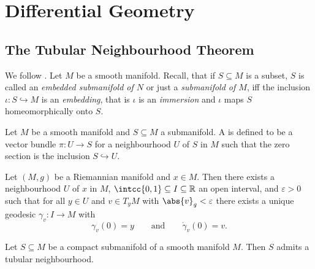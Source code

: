 \chapter{Differential Geometry}
\section*{The Tubular Neighbourhood Theorem}
We follow \cite[344--346]{spivak:DGI:2005}. Let $M$ be a smooth manifold. Recall, that if $S \subseteq M$ is a subset, $S$ is called an \emph{embedded submanifold of $N$} or just a \emph{submanifold of $M$}, iff the inclusion $\iota : S \hookrightarrow M$ is an \emph{embedding}, that is $\iota$ is an \emph{immersion} and $\iota$ maps $S$ homeomorphically onto $S$.

\begin{definition}
	Let $M$ be a smooth manifold and $S \subseteq M$ a submanifold. A  is defined to be a vector bundle $\pi : U \to S$ for a neighbourhood $U$ of $S$ in $M$ such that the zero section is the inclusion $S \hookrightarrow U$.
\end{definition}

\begin{proposition}
	\label{prop:existence_and_uniqueness_of_geodesics}
	Let $(M,g)$ be a Riemannian manifold and $x \in M$. Then there exists a neighbourhood $U$ of $x$ in $M$, $\intcc{0,1} \subseteq I \subseteq \mathbb{R}$ an open interval, and $\varepsilon > 0$ such that for all $y \in U$ and $v \in T_yM$ with $\abs{v}_g < \varepsilon$ there exists a unique geodesic $\gamma_v : I \to M$ with
	\begin{equation*}
		\gamma_v(0) = y \qquad \text{and} \qquad \dot{\gamma}_v(0) = v.
	\end{equation*}
\end{proposition}

\begin{theorem}
	\label{thm:tubular_neighbourhood_theorem}
	Let $S \subseteq M$ be a compact submanifold of a smooth manifold $M$. Then $S$ admits a tubular neighbourhood.
\end{theorem}

